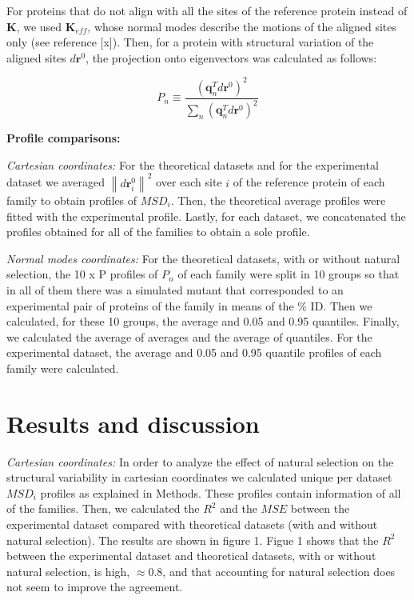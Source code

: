 \documentclass{article}
\begin{document}
\begin{multicols}{2}
For proteins that do not align with all the sites of the reference protein instead of $\mathbf{K}$, we used $\mathbf{K}_{eff}$, whose normal modes describe the motions of the aligned sites only (see reference [x]).
Then, for a protein with structural variation of the aligned sites $d\mathbf{r}^{0}$, the projection onto eigenvectors was calculated as follows:

\begin{equation}
P_{n} \equiv \frac{(\mathbf{q}^{T}_{n}d\mathbf{r}^{0})^2}{\sum_{n}(\mathbf{q}^{T}_{n}d\mathbf{r}^{0})^2}
\end{equation}

{\bf Profile comparisons:}

{\it Cartesian coordinates:} For the theoretical datasets and for the experimental dataset we averaged $\left\|d\mathbf{r}^{0}_{i}\right\|^{2}$ over each site $i$ of the reference protein of each family to obtain profiles of $MSD_{i}$. Then, the theoretical average profiles were fitted with the experimental profile. Lastly, for each dataset, we concatenated the profiles obtained for all of the families to obtain a sole profile.

{\it Normal modes coordinates:} For the theoretical datasets, with or without natural selection, the 10 x P profiles of $P_{n}$ of each family were split in 10 groups so that in all of them there was a simulated mutant that corresponded to an experimental pair of proteins of the family in means of the \% ID. Then we calculated, for these 10 groups, the average and 0.05 and 0.95 quantiles. Finally, we calculated the average of averages and the average of quantiles. 
For the experimental dataset, the average and 0.05 and 0.95 quantile profiles of each family were calculated.

\section{Results and discussion}
{\it Cartesian coordinates:}
In order to analyze the effect of natural selection on the structural variability in cartesian coordinates we calculated unique per dataset $MSD_{i}$ profiles as explained in Methods. These profiles contain information of all of the families. Then, we calculated the $R^2$ and the $MSE$ between the experimental dataset compared with theoretical datasets (with and without natural selection). The results are shown in figure 1. 
Figue 1 shows that the $R^2$ between the experimental dataset and theoretical datasets, with or without natural selection, is high, $\approx 0.8$, and that accounting for natural selection does not seem to improve the agreement. 


\end{multicols}
\end{document}
